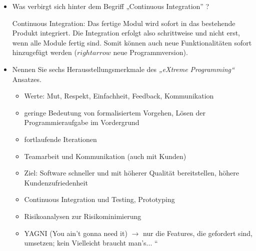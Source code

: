 \documentclass{lehramt-informatik-aufgabe}
\begin{document}
\begin{itemize}

%

\item Was verbirgt sich hinter dem Begriff „Continuous Integration”
?

\begin{antwort}
Continuous Integration: Das fertige Modul wird sofort in das bestehende
Produkt integriert. Die Integration erfolgt also schrittweise und nicht
erst, wenn alle Module fertig sind. Somit können auch neue
Funktionalitäten sofort hinzugefügt werden ($rightarrow$ neue
Programmversion).
\end{antwort}

%

\item Nennen Sie sechs Herausstellungsmerkmale des \emph{„eXtreme
Programming“} Ansatzes.

\begin{antwort}
\begin{itemize}
\item Werte: Mut, Respekt, Einfachheit, Feedback, Kommunikation

\item geringe Bedeutung von formalisiertem Vorgehen, Lösen der
Programmieraufgabe im Vordergrund

\item fortlaufende Iterationen

\item Teamarbeit und Kommunikation (auch mit Kunden)

\item Ziel: Software schneller und mit höherer Qualität bereitstellen,
höhere Kundenzufriedenheit

\item Continuous Integration und Testing, Prototyping

\item Risikoanalysen zur Risikominimierung

\item YAGNI (You ain’t gonna need it) $\rightarrow$ nur die Features,
die gefordert sind, umsetzen; kein Vielleicht braucht man’s... “
\end{itemize}
\end{antwort}


\end{itemize}
\end{document}
